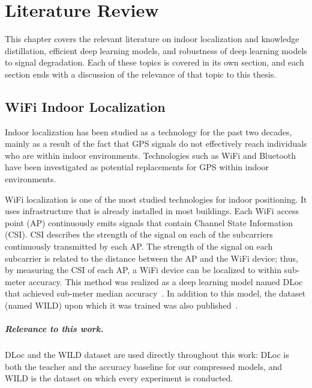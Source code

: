 \chapter{Literature Review}
\label{ch:literature}

This chapter covers the relevant literature on indoor localization and knowledge distillation, efficient
deep learning models, and robustness of deep learning models to signal degradation. Each of these topics
is covered in its own section, and each section ends with a discussion of the relevance of that topic to
this thesis.

\section{WiFi Indoor Localization}
\label{sec:lit:localization}

Indoor localization has been studied as a technology for the past two decades, mainly as a result of the
fact that GPS signals do not effectively reach individuals who are within indoor environments.
Technologies such as WiFi and Bluetooth have been investigated as potential replacements for GPS within
indoor environments.

WiFi localization is one of the most studied technologies for indoor positioning. It uses infrastructure
that is already installed in most buildings. Each WiFi access point (AP) continuously emits signals that
contain Channel State Information (CSI). CSI describes the strength of the signal on each of the
subcarriers continuously transmitted by each AP. The strength of the signal on each subcarrier is
related to the distance between the AP and the WiFi device; thus, by measuring the CSI of each AP, a
WiFi device can be localized to within sub-meter accuracy. This method was realized as a deep learning
model named DLoc that achieved sub-meter median accuracy~\cite{ayyalasomayajula2020deep}. In addition to
this model, the dataset (named WILD) upon which it was trained was also
published~\cite{ayyalasomayajula2020deep}.

\paragraph{Relevance to this work.} DLoc and the WILD dataset are used directly throughout this work:
DLoc is both the teacher and the accuracy baseline for our compressed models, and WILD is the dataset on
which every experiment is conducted.


